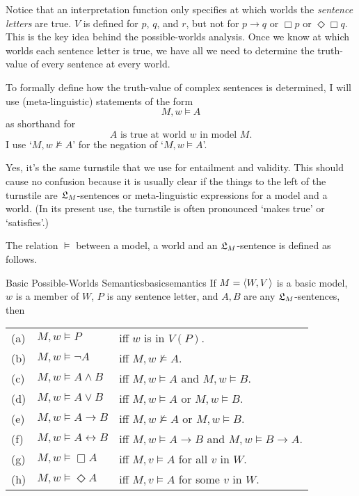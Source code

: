 Notice that an interpretation function only specifies at which worlds the
\emph{sentence letters} are true. $V$ is defined for $p$, $q$, and $r$, but not
for $p \to q$ or $\Box p$ or $\Diamond \Box q$. This is the key idea behind the
possible-worlds analysis. Once we know at which worlds each sentence letter is
true, we have all we need to determine the truth-value of every sentence at
every world.

To formally define how the truth-value of complex sentences is determined, I
will use (meta-linguistic) statements of the form
\[
  M,w \models A
\]
%
as shorthand for
%
\[
  \text{$A$ is true at world $w$ in model $M$}.
\]
I use `$M,w \not\models A$' for the negation of `$M,w \models A$'.

Yes, it's the same turnstile that we use for entailment and validity. This
should cause no confusion because it is usually clear if the things to the left
of the turnstile are $\mathfrak{L}_M$-sentences or meta-linguistic expressions for a model
and a world. (In its present use, the turnstile is often pronounced `makes true'
or `satisfies'.)

The relation $\models$ between a model, a world and an $\mathfrak{L}_M$-sentence is
defined as follows.

\begin{definition}{Basic Possible-Worlds Semantics}{basicsemantics}
  If $M = \t{W,V}$ is a basic model, $w$ is a member of $W$, $P$ is
  any sentence letter, and $A,B$ are any $\mathfrak{L}_M$-sentences, then

  \medskip
  \begin{tabular}{lll}
    (a) & $M,w \models P$ &iff $w$ is in $V(P)$.\\
    (b) & $M,w \models \neg A$ &iff $M,w \not\models A$.\\
    (c) & $M,w \models A \land B$ &iff $M,w \models A$ and $M,w \models B$.\\
    (d) & $M,w \models A \lor B$ &iff $M,w \models A$ or $M,w \models B$.\\
    (e) & $M,w \models A \to B$ &iff $M,w \not\models A$ or $M,w \models B$.\\
    (f) & $M,w \models A \leftrightarrow B$ &iff $M,w \models A\to B$ and $M,w \models B\to A$.\\
    (g) & $M,w \models \Box A$ &iff $M,v \models A$ for all $v$ in $W$.\\
    (h) & $M,w \models \Diamond A$ &iff $M,v \models A$ for some $v$ in $W$.
  \end{tabular}
\end{definition}

